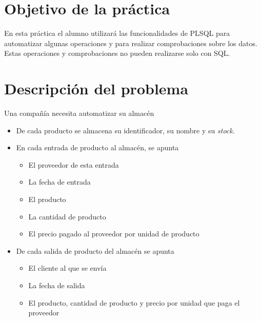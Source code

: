 
\usepackage{needspace}




\renewcommand{\hmwkTitle}{Práctica PLSQL}
\renewcommand{\hmwkClass}{Gestión de Bases de datos}







\primerapagina


\section{Objetivo de la práctica}
En esta práctica el alumno utilizará las funcionalidades de PLSQL para automatizar algunas operaciones y para realizar comprobaciones sobre los datos. Estas operaciones y comprobaciones no pueden realizarse solo con SQL.


\newcommand{\maximopiezasavion}{15}
\newcommand{\maximopiezaspieza}{5}


\section{Descripción del problema}
Una compañía necesita automatizar su almacén
\begin{itemize}
\item De cada producto se almacena su identificador, su nombre y su \textit{stock}.
\item En cada entrada de producto al almacén, se apunta
  \begin{itemize}
  \item El proveedor de esta entrada
  \item La fecha de entrada
  \item El producto
  \item La cantidad de producto
  \item El precio pagado al proveedor por unidad de producto
  \end{itemize}
\item De cada salida de producto del almacén se apunta
  \begin{itemize}
  \item El cliente al que se envía
  \item La fecha de salida
  \item El producto, cantidad de producto y precio por unidad que paga el proveedor
  \end{itemize}
\end{itemize}




